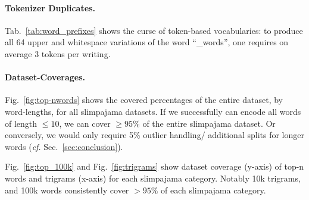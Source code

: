 \documentclass[11pt]{article}
\begin{document}
\paragraph{Tokenizer Duplicates.}
Tab.~\ref{tab:word_prefixes} shows the curse of token-based vocabularies: to produce all 64 upper and whitespace variations of the word ``\_words'', one requires on average 3 tokens per writing.

\paragraph{Dataset-Coverages.}
Fig.~\ref{fig:top-nwords} shows the covered percentages of the entire dataset, by word-lengths, for all slimpajama datasets.
If we successfully can encode all words of length $\leq 10$, we can cover $\geq 95\%$ of the entire slimpajama dataset. Or conversely, we would only require 5\% outlier handling/ additional splits for longer words (\emph{cf.} Sec.~\ref{sec:conclusion}).

Fig.~\ref{fig:top_100k} and Fig.~\ref{fig:trigrams} show dataset coverage (y-axis) of top-n words and trigrams (x-axis) for each slimpajama category. Notably 10k trigrams, and 100k words consistently cover $>95\%$ of each slimpajama category.
\end{document}
